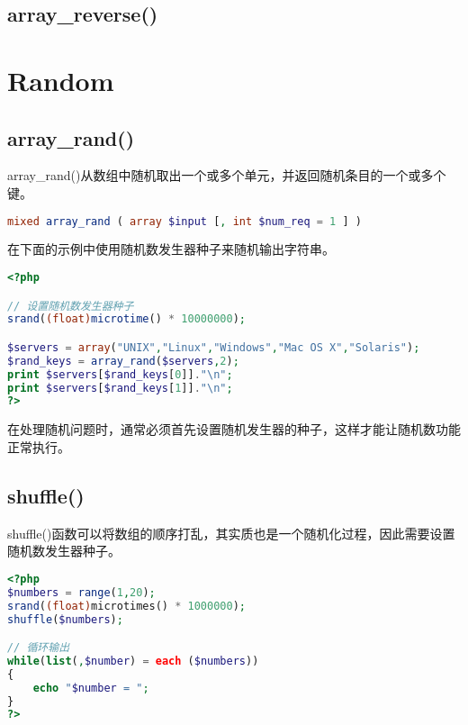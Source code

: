 \subsection{array\_reverse()}



\section{Random}


\subsection{array\_rand()}



array\_rand()从数组中随机取出一个或多个单元，并返回随机条目的一个或多个键。


\begin{lstlisting}[language=PHP]
mixed array_rand ( array $input [, int $num_req = 1 ] )
\end{lstlisting}


在下面的示例中使用随机数发生器种子来随机输出字符串。


\begin{lstlisting}[language=PHP]
<?php

// 设置随机数发生器种子
srand((float)microtime() * 10000000);

$servers = array("UNIX","Linux","Windows","Mac OS X","Solaris");
$rand_keys = array_rand($servers,2);
print $servers[$rand_keys[0]]."\n";
print $servers[$rand_keys[1]]."\n";
?>
\end{lstlisting}

在处理随机问题时，通常必须首先设置随机发生器的种子，这样才能让随机数功能正常执行。


\subsection{shuffle()}


shuffle()函数可以将数组的顺序打乱，其实质也是一个随机化过程，因此需要设置随机数发生器种子。

\begin{lstlisting}[language=PHP]
<?php
$numbers = range(1,20);
srand((float)microtimes() * 1000000);
shuffle($numbers);

// 循环输出
while(list(,$number) = each ($numbers))
{
	echo "$number = ";
}
?>
\end{lstlisting}



